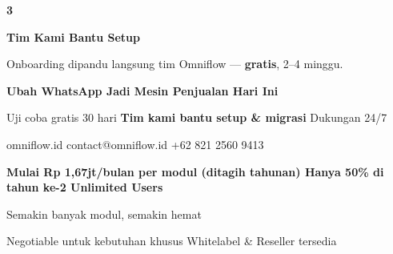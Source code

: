\documentclass[a4paper]{article}
\begin{document}
\begin{center}
\begin{minipage}[t]{0.318\textwidth}
{\begin{minipage}[t][4.7cm][c]{\dimexpr\linewidth-2\fboxsep\relax}
            \begin{center}{\fontsize{22}{26}\selectfont\bfseries\color{BluePrimary} 3}\end{center}
            \vspace{2pt}
            \begin{center}
                {\fontsize{10}{13}\selectfont\bfseries\color{BlueDark} Tim Kami Bantu Setup}\par\vspace{3pt}
                {\fontsize{9}{12}\selectfont\color{TextDark} Onboarding dipandu langsung tim Omniflow --- \textbf{gratis}, 2--4 minggu.}
            \end{center}
        \end{minipage}}
\end{minipage}
\end{center}

\vspace{8pt}

{\setlength{\fboxsep}{10pt}\setlength{\fboxrule}{0pt}%
\noindent\colorbox{BluePrimary}{%
    \begin{minipage}{\dimexpr\textwidth-2\fboxsep\relax}
        \centering
        {\fontsize{13}{16}\selectfont\bfseries\color{White} Ubah WhatsApp Jadi Mesin Penjualan Hari Ini}\par\vspace{3pt}
        {\fontsize{9.5}{12}\selectfont\color{BlueMid} Uji coba gratis 30 hari \enspace\textbullet\enspace \textbf{Tim kami bantu setup \& migrasi} \enspace\textbullet\enspace Dukungan 24/7}\par\vspace{2pt}
        {\fontsize{9.5}{12}\selectfont\color{BlueLight} omniflow.id \enspace\textbullet\enspace contact@omniflow.id \enspace\textbullet\enspace +62 821 2560 9413}
    \end{minipage}}}


\vspace{6pt}

{\setlength{\fboxsep}{8pt}\setlength{\fboxrule}{0pt}%
\noindent\colorbox{BlueBg}{%
    \begin{minipage}{\dimexpr\textwidth-2\fboxsep\relax}
        \centering
        {\fontsize{9}{12}\selectfont\bfseries\color{BluePrimary}
        Mulai Rp 1,67jt/bulan per modul (ditagih tahunan) \enspace\textbullet\enspace Hanya 50\% di tahun ke-2 \enspace\textbullet\enspace Unlimited Users}\par\vspace{1pt}
        {\fontsize{8.5}{11}\selectfont\color{BlueDark}
        Semakin banyak modul, semakin hemat}\par\vspace{1pt}
        {\fontsize{8}{10}\selectfont\color{TextLight}
        Negotiable untuk kebutuhan khusus \enspace\textbullet\enspace Whitelabel \& Reseller tersedia}
    \end{minipage}}}

\restoregeometry
\pagestyle{empty}
\end{document}

